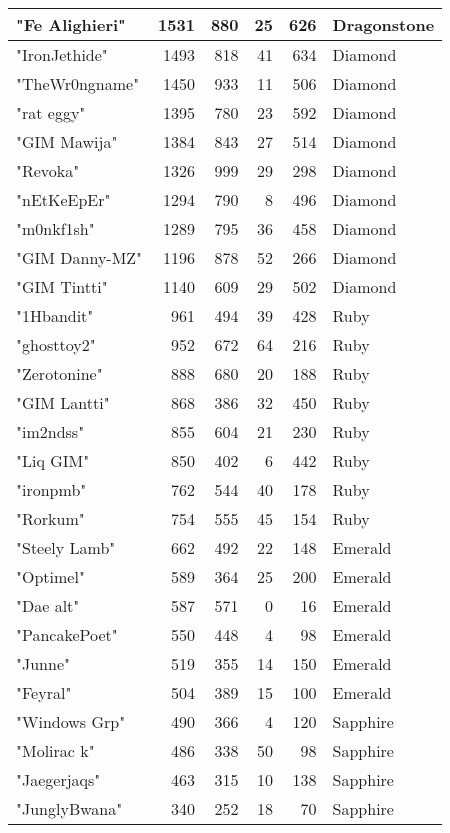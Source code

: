 \documentclass{article}
\begin{document}
\begin{table}[htbp]
\begin{tabular}{|l|r|r|r|r|l|}
"Fe Alighieri" & 1531 & 880 & 25 & 626 & Dragonstone \\ \hline
"IronJethide" & 1493 & 818 & 41 & 634 & Diamond \\ \hline
"TheWr0ngname" & 1450 & 933 & 11 & 506 & Diamond \\ \hline
"rat eggy" & 1395 & 780 & 23 & 592 & Diamond \\ \hline
"GIM Mawija" & 1384 & 843 & 27 & 514 & Diamond \\ \hline
"Revoka" & 1326 & 999 & 29 & 298 & Diamond \\ \hline
"nEtKeEpEr" & 1294 & 790 & 8 & 496 & Diamond \\ \hline
"m0nkf1sh" & 1289 & 795 & 36 & 458 & Diamond \\ \hline
"GIM Danny-MZ" & 1196 & 878 & 52 & 266 & Diamond \\ \hline
"GIM Tintti" & 1140 & 609 & 29 & 502 & Diamond \\ \hline
"1Hbandit" & 961 & 494 & 39 & 428 & Ruby \\ \hline
"ghosttoy2" & 952 & 672 & 64 & 216 & Ruby \\ \hline
"Zerotonine" & 888 & 680 & 20 & 188 & Ruby \\ \hline
"GIM Lantti" & 868 & 386 & 32 & 450 & Ruby \\ \hline
"im2ndss" & 855 & 604 & 21 & 230 & Ruby \\ \hline
"Liq GIM" & 850 & 402 & 6 & 442 & Ruby \\ \hline
"ironpmb" & 762 & 544 & 40 & 178 & Ruby \\ \hline
"Rorkum" & 754 & 555 & 45 & 154 & Ruby \\ \hline
"Steely Lamb" & 662 & 492 & 22 & 148 & Emerald \\ \hline
"Optimel" & 589 & 364 & 25 & 200 & Emerald \\ \hline
"Dae alt" & 587 & 571 & 0 & 16 & Emerald \\ \hline
"PancakePoet" & 550 & 448 & 4 & 98 & Emerald \\ \hline
"Junne" & 519 & 355 & 14 & 150 & Emerald \\ \hline
"Feyral" & 504 & 389 & 15 & 100 & Emerald \\ \hline
"Windows Grp" & 490 & 366 & 4 & 120 & Sapphire \\ \hline
"Molirac k" & 486 & 338 & 50 & 98 & Sapphire \\ \hline
"Jaegerjaqs" & 463 & 315 & 10 & 138 & Sapphire \\ \hline
"JunglyBwana" & 340 & 252 & 18 & 70 & Sapphire \\ \hline

\end{tabular}
\end{table}
\end{document}
